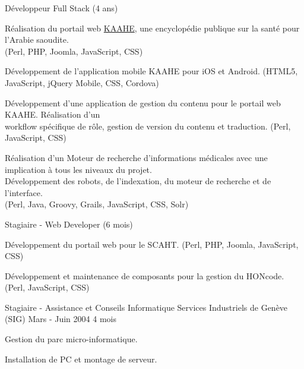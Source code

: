 \begin{cventries}
  \cventry
    {Développeur Full Stack (4 ans)}
    {}
    {}
    {}
    {
      \begin{cvitems}
        \item Réalisation du portail web
          {\color{awesome-skyblue}\href{https://kaahe.org/}{KAAHE}}, une
          encyclopédie publique sur la santé pour l'Arabie saoudite.\\
          (Perl, PHP, Joomla, JavaScript, CSS)
        \item Développement de l'application mobile KAAHE pour iOS et Android.
          (HTML5, JavaScript, jQuery Mobile, CSS, Cordova)
        \item Développement d'une application de gestion du contenu pour le
          portail web KAAHE. Réalisation d'un \\workflow spécifique de rôle,
          gestion de version du contenu et traduction. (Perl, JavaScript, CSS)
        \item Réalisation d'un Moteur de recherche d'informations médicales
          avec une implication à tous les niveaux du projet.\\
          Développement des robots, de l'indexation, du moteur de recherche
          et de l'interface.\\
          (Perl, Java, Groovy, Grails, JavaScript, CSS, Solr)
      \end{cvitems}
    }

  \cventry
    {Stagiaire - Web Developer (6 mois)}
    {}
    {}
    {}
    {
      \begin{cvitems}
        \item Développement du portail web pour le SCAHT.
          (Perl, PHP, Joomla, JavaScript, CSS)
        \item Développement et maintenance de composants pour la gestion du
          HONcode. (Perl, JavaScript, CSS)
      \end{cvitems}
    }

  \cventry
    {Stagiaire - Assistance et Conseils Informatique}
    {Services Industriels de Genève (SIG)}
    {Mars - Juin 2004}
    {4 mois}
    {
      \begin{cvitems}
        \item Gestion du parc micro-informatique.
        \item Installation de PC et montage de serveur.
      \end{cvitems}
    }

\end{cventries}
